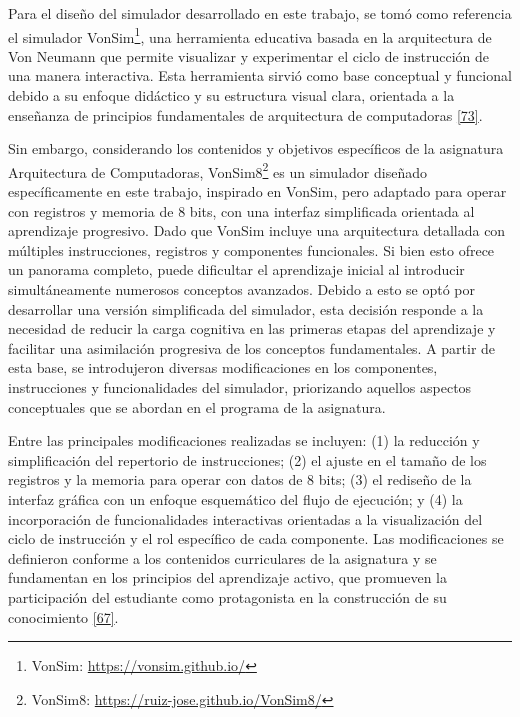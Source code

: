 \documentclass[12pt,oneside]{templates/unerthesis}
\begin{document}
Para el diseño del simulador desarrollado en este trabajo, se tomó como referencia el simulador VonSim\footnote{VonSim: \url{https://vonsim.github.io/}}, una herramienta educativa basada en la arquitectura de Von Neumann que permite visualizar y experimentar el ciclo de instrucción de una manera interactiva. Esta herramienta sirvió como base conceptual y funcional debido a su enfoque didáctico y su estructura visual clara, orientada a la enseñanza de principios fundamentales de arquitectura de computadoras \protect\hyperlink{ref-vonsim}{{[}73{]}}.

Sin embargo, considerando los contenidos y objetivos específicos de la asignatura Arquitectura de Computadoras,
VonSim8\footnote{VonSim8: \url{https://ruiz-jose.github.io/VonSim8/}} es un simulador diseñado específicamente en este trabajo, inspirado en VonSim, pero adaptado para operar con registros y memoria de 8 bits, con una interfaz simplificada orientada al aprendizaje progresivo.
Dado que VonSim incluye una arquitectura detallada con múltiples instrucciones, registros y componentes funcionales. Si bien esto ofrece un panorama completo, puede dificultar el aprendizaje inicial al introducir simultáneamente numerosos conceptos avanzados. Debido a esto se optó por desarrollar una versión simplificada del simulador, esta decisión responde a la necesidad de reducir la carga cognitiva en las primeras etapas del aprendizaje y facilitar una asimilación progresiva de los conceptos fundamentales. A partir de esta base, se introdujeron diversas modificaciones en los componentes, instrucciones y funcionalidades del simulador, priorizando aquellos aspectos conceptuales que se abordan en el programa de la asignatura.

Entre las principales modificaciones realizadas se incluyen: (1) la reducción y simplificación del repertorio de instrucciones; (2) el ajuste en el tamaño de los registros y la memoria para operar con datos de 8 bits; (3) el rediseño de la interfaz gráfica con un enfoque esquemático del flujo de ejecución; y (4) la incorporación de funcionalidades interactivas orientadas a la visualización del ciclo de instrucción y el rol específico de cada componente. Las modificaciones se definieron conforme a los contenidos curriculares de la asignatura y se fundamentan en los principios del aprendizaje activo, que promueven la participación del estudiante como protagonista en la construcción de su conocimiento \protect\hyperlink{ref-bonwell1991active}{{[}67{]}}.
\end{document}
